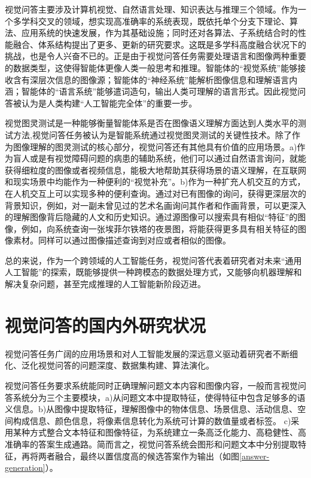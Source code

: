 视觉问答主要涉及计算机视觉、自然语言处理、知识表达与推理三个领域。作为一个多学科交叉的领域，想实现高准确率的系统表现，既依托单个分支下理论、算法、应用系统的快速发展，作为其基础设施；同时还对各算法、子系统结合时的性能融合、体系结构提出了更多、更新的研究要求。这既是多学科高度融合状况下的挑战，也是令人兴奋不已的。正是由于视觉问答任务需要处理语言和图像两种重要的数据类型，这使得智能体更像人类一般思考和推理。智能体的“视觉系统”能够接收含有深层次信息的图像源；智能体的“神经系统”能解析图像信息和理解语言内涵；智能体的“语言系统”能够遣词造句，输出人类可理解的语言形式。因此视觉问答被认为是人类构建“人工智能完全体”的重要一步。

视觉图灵测试是一种能够衡量智能体系是否在图像语义理解方面达到人类水平的测试方法,视觉问答任务被认为是智能系统通过视觉图灵测试的关键性技术。除了作为图像理解的图灵测试的核心部分，视觉问答还有其他具有价值的应用场景。a)作为盲人或是有视觉障碍问题的病患的辅助系统，他们可以通过自然语言询问，就能获得细粒度的图像或者视频信息，能极大地帮助其获得场景的语义理解，在互联网和现实场景中均能作为一种便利的“视觉补充”。b)作为一种扩充人机交互的方式，在人机交互上可以实现多种的便利查询。通过对已有图像的询问，获得更深层次的背景知识，例如，对一副未曾见过的艺术名画询问其作者和作画背景，可以更深入的理解图像背后隐藏的人文和历史知识。通过源图像可以搜索具有相似“特征”的图像，例如，向系统查询一张埃菲尔铁塔的夜景图，将能获得更多具有相关特征的图像素材。同样可以通过图像描述查询到对应或者相似的图像。

总的来说，作为一个跨领域的人工智能任务，视觉问答代表着研究者对未来“通用人工智能”的探索，既能够提供一种跨模态的数据处理方式，又能够向机器理解和解决复杂问题，甚至完成推理的人工智能新阶段迈进。


\section{视觉问答的国内外研究状况}
视觉问答任务广阔的应用场景和对人工智能发展的深远意义驱动着研究者不断细化、泛化视觉问答的问题深度、数据集构建、算法演化。



视觉问答任务要求系统能同时正确理解问题文本内容和图像内容，一般而言视觉问答系统分为三个主要模块，a)从问题文本中提取特征，使得特征中包含足够多的语义信息。b)从图像中提取特征，理解图像中的物体信息、场景信息、活动信息、空间构成信息、颜色信息，将像素信息转化为系统可计算的数值量或者标签。 c)采用某种方式整合文本特征和图像特征，为系统建立一条高泛化能力、高稳健性、高准确率的答案生成通路。简而言之，视觉问答系统会图形和问题文本中分别提取特征，再将两者融合，最终以置信度高的候选答案作为输出（如图\ref{answer-generation}）。

